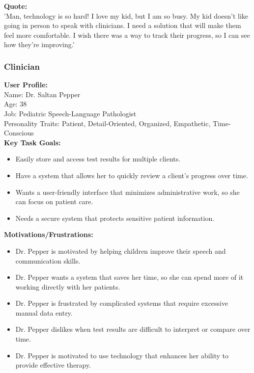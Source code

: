 \documentclass[12pt]{article}
\begin{document}
\textbf{Quote:}\\
'Man, technology is so hard! I love my kid, but I am so busy. My kid doesn't like going in person to speak with clinicians. I need a solution that will make them feel more comfortable. I wish there was a way to track their progress, so I can see how they're improving.'\\

\subsubsection*{Clinician}
\textbf{User Profile:}\\
Name: Dr. Saltan Pepper\\
Age: 38\\
Job: Pediatric Speech-Language Pathologist\\
Personality Traits: Patient, Detail-Oriented, Organized, Empathetic, Time-Conscious\\

\textbf{Key Task Goals:}
\begin{itemize}
  \item Easily store and access test results for multiple clients.
  \item Have a system that allows her to quickly review a client's progress over time.
  \item Wants a user-friendly interface that minimizes administrative work, so she can focus on patient care.
  \item Needs a secure system that protects sensitive patient information.
  \end{itemize}

\textbf{Motivations/Frustrations:}
\begin{itemize}
  \item Dr. Pepper is motivated by helping children improve their speech and communication skills.
  \item Dr. Pepper wants a system that saves her time, so she can spend more of it working directly with her patients.
  \item Dr. Pepper is frustrated by complicated systems that require excessive manual data entry.
  \item Dr. Pepper dislikes when test results are difficult to interpret or compare over time.
  \item Dr. Pepper is motivated to use technology that enhances her ability to provide effective therapy.
\end{itemize}
\end{document}
